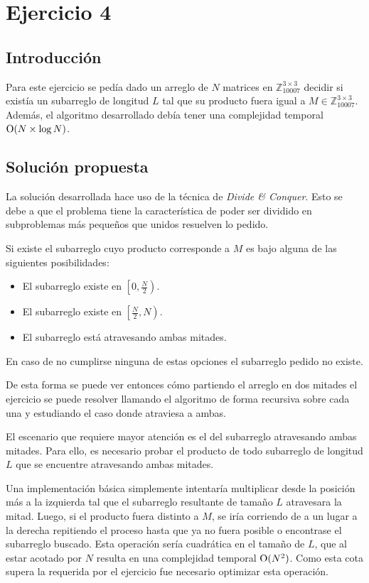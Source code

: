 \section{Ejercicio 4}

\subsection{Introducción}

Para este ejercicio se pedía dado un arreglo de $N$ matrices en
$\mathbb{Z}_{10007}^{3 \times 3}$ decidir si existía un subarreglo de longitud
$L$ tal que su producto fuera igual a $M \in \mathbb{Z}_{10007}^{3 \times 3}$.
Además, el algoritmo desarrollado debía tener una complejidad temporal $\operatorname{O}(N
\times \log N)$.

\subsection{Solución propuesta}\label{ej4:sol}

La solución desarrollada hace uso de la técnica de \emph{Divide \& Conquer}.
Esto se debe a que el problema tiene la característica de poder ser dividido en
subproblemas más pequeños que unidos resuelven lo pedido.

Si existe el subarreglo cuyo producto corresponde a $M$ es bajo alguna de
las siguientes posibilidades:

\begin{itemize}
	\item El subarreglo existe en $\left[ 0,\frac{N}{2} \right)$.
	\item El subarreglo existe en $\left[\frac{N}{2}, N \right)$.
	\item El subarreglo está atravesando ambas mitades.
\end{itemize}

En caso de no cumplirse ninguna de estas opciones el subarreglo pedido no
existe.

De esta forma se puede ver entonces cómo partiendo el arreglo en dos
mitades el ejercicio se puede resolver llamando el algoritmo de forma recursiva
sobre cada una y estudiando el caso donde atraviesa a ambas.

El escenario que requiere mayor atención es el del subarreglo atravesando ambas mitades.
Para ello, es necesario probar el producto de todo subarreglo de longitud $L$
que se encuentre atravesando ambas mitades.

Una implementación básica simplemente intentaría multiplicar desde la posición
más a la izquierda tal que el subarreglo resultante de tamaño $L$ atravesara la
mitad. Luego, si el producto fuera distinto a $M$, se iría corriendo de a un
lugar a la derecha repitiendo el proceso hasta que ya no fuera posible o
encontrase el subarreglo buscado. Esta operación sería cuadrática en el tamaño
de $L$, que al estar acotado por $N$ resulta en una complejidad temporal
$\operatorname{O}(N^{2})$. Como esta cota supera la requerida por el ejercicio fue necesario
optimizar esta operación.

